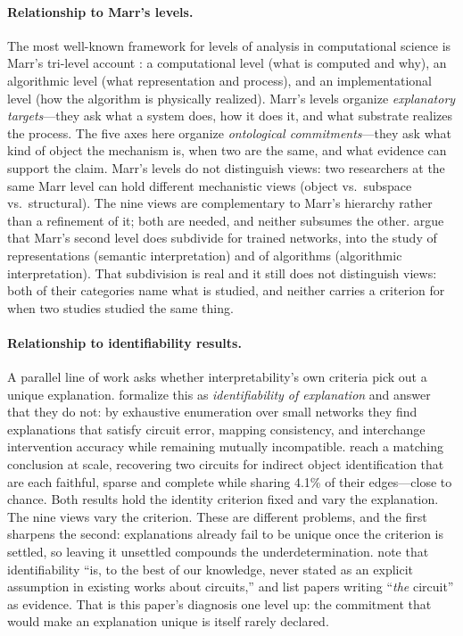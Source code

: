 \documentclass{article}
\begin{document}
\paragraph{Relationship to Marr's levels.}
The most well-known framework for levels of analysis in computational
science is Marr's tri-level account \citep{marr1982}: a computational
level (what is computed and why), an algorithmic level (what
representation and process), and an implementational level (how the
algorithm is physically realized).  Marr's levels organize
\emph{explanatory targets}---they ask what a system does, how it does
it, and what substrate realizes the process.  The five axes here
organize \emph{ontological commitments}---they ask what kind of object
the mechanism is, when two are the same, and what evidence can support
the claim.  Marr's levels do not distinguish views: two researchers
at the same Marr level can hold different mechanistic views (object vs.\
subspace vs.\ structural).  The nine views are complementary to Marr's
hierarchy rather than a refinement of it; both are needed, and neither
subsumes the other.  \citet{davies2024} argue that Marr's second level
does subdivide for trained networks, into the study of representations
(semantic interpretation) and of algorithms (algorithmic interpretation).
That subdivision is real and it still does not distinguish views: both of
their categories name what is studied, and neither carries a criterion
for when two studies studied the same thing.

\paragraph{Relationship to identifiability results.}
A parallel line of work asks whether interpretability's own criteria pick
out a unique explanation.  \citet{meloux2025} formalize this as
\emph{identifiability of explanation} and answer that they do not: by
exhaustive enumeration over small networks they find explanations that
satisfy circuit error, mapping consistency, and interchange intervention
accuracy while remaining mutually incompatible.  \citet{chen2026} reach a
matching conclusion at scale, recovering two circuits for indirect object
identification that are each faithful, sparse and complete while sharing
4.1\% of their edges---close to chance.  Both results hold the identity
criterion fixed and vary the explanation.  The nine views vary the
criterion.  These are different problems, and the first sharpens the
second: explanations already fail to be unique once the criterion is
settled, so leaving it unsettled compounds the underdetermination.
\citeauthor{meloux2025} note that identifiability ``is, to the best of our
knowledge, never stated as an explicit assumption in existing works about
circuits,'' and list papers writing ``\emph{the} circuit'' as evidence.
That is this paper's diagnosis one level up: the commitment that would
make an explanation unique is itself rarely declared.
\end{document}
